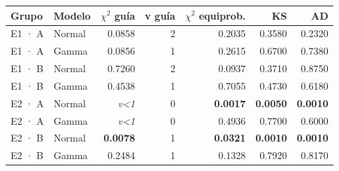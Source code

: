 \begin{tabular}{llrrrrr}
\toprule
\textbf{Grupo} & \textbf{Modelo} & \textbf{$\chi^2$ guía} & \textbf{v guía} & \textbf{$\chi^2$ equiprob.} & \textbf{KS} & \textbf{AD} \\ \midrule
E1 · A & Normal & 0.0858 & 2 & 0.2035 & 0.3580 & 0.2320 \\
E1 · A & Gamma & 0.0856 & 1 & 0.2615 & 0.6700 & 0.7380 \\
E1 · B & Normal & 0.7260 & 2 & 0.0937 & 0.3710 & 0.8750 \\
E1 · B & Gamma & 0.4538 & 1 & 0.7055 & 0.4730 & 0.6180 \\
E2 · A & Normal & \textit{v<1} & 0 & \textbf{\color{bermellon}0.0017} & \textbf{\color{bermellon}0.0050} & \textbf{\color{bermellon}0.0010} \\
E2 · A & Gamma & \textit{v<1} & 0 & 0.4936 & 0.7700 & 0.6000 \\
E2 · B & Normal & \textbf{\color{bermellon}0.0078} & 1 & \textbf{\color{bermellon}0.0321} & \textbf{\color{bermellon}0.0010} & \textbf{\color{bermellon}0.0010} \\
E2 · B & Gamma & 0.2484 & 1 & 0.1328 & 0.7920 & 0.8170 \\
\bottomrule
\end{tabular}